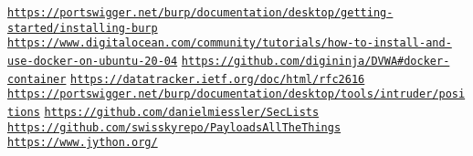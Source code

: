 \documentclass[twocolumn]{article}
\begin{document}
\begin{thebibliography}{9}

    \texttt{\url{https://portswigger.net/burp/documentation/desktop/getting-started/installing-burp}}
    \texttt{\url{https://www.digitalocean.com/community/tutorials/how-to-install-and-use-docker-on-ubuntu-20-04}}
    \texttt{\url{https://github.com/digininja/DVWA\#docker-container}}
    \texttt{\url{https://datatracker.ietf.org/doc/html/rfc2616}}
    \texttt{\url{https://portswigger.net/burp/documentation/desktop/tools/intruder/positions}}
    \texttt{\url{https://github.com/danielmiessler/SecLists}}
    \texttt{\url{https://github.com/swisskyrepo/PayloadsAllTheThings}}
    \texttt{\url{https://www.jython.org/}}

\end{thebibliography}
\end{document}
